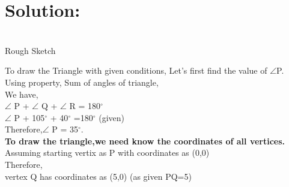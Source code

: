 \documentclass[a4paper,12pt]{article}
\begin{document}
\section*{\small Solution:}
\begin{center}

\\
\hspace*{2cm}Rough Sketch\\
\end{center}

\vspace*{1cm}

To draw the Triangle with given conditions,
Let's first find the value of $\angle$P.\\

Using property, Sum of angles of triangle,\\
 
We have,\\

$\angle$ P + $\angle$ Q + $\angle$ R = 180$^{\circ}$\\

$\angle$ P  + 105$^{\circ}$ + 40$^{\circ}$ =180$^{\circ}$ \hspace*{2cm} (given) \\

Therefore,$\angle$ P  = 35$^{\circ}$.\\

\textbf{To draw the triangle,we need know the coordinates of all vertices.}\\

 Assuming starting vertix as P with coordinates as (0,0)\\

Therefore,\\
\hspace*{0.5cm} vertex Q has coordinates as (5,0) \hspace*{3cm}(as given PQ=5)\\
\end{document}
